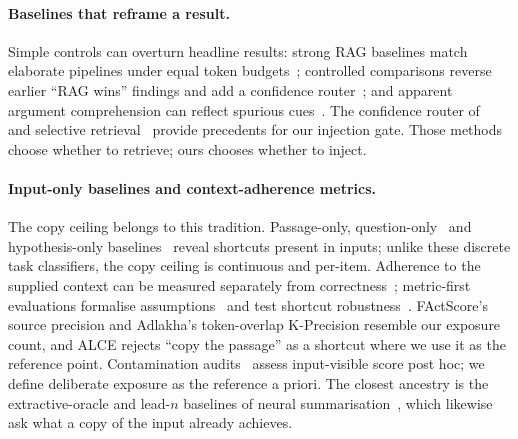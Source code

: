 \documentclass[10pt,twocolumn]{article}
\begin{document}
\paragraph{Baselines that reframe a result.}
Simple controls can overturn headline results: strong RAG baselines match elaborate pipelines under equal token budgets~\cite{laitenberger2025stronger}; controlled comparisons reverse earlier ``RAG wins'' findings and add a confidence router~\cite{li2024ragorlongcontext}; and apparent argument comprehension can reflect spurious cues~\cite{niven2019probing}. The confidence router of~\textcite{li2024ragorlongcontext} and selective retrieval~\cite{asai2024selfrag,jeong2024adaptiverag,mallen2023trust} provide precedents for our injection gate. Those methods choose whether to retrieve; ours chooses whether to inject.

\paragraph{Input-only baselines and context-adherence metrics.}
The copy ceiling belongs to this tradition. Passage-only, question-only~\cite{kaushik2018reading} and hypothesis-only baselines~\cite{gururangan2018artifacts,poliak2018hypothesis} reveal shortcuts present in inputs; unlike these discrete task classifiers, the copy ceiling is continuous and per-item. Adherence to the supplied context can be measured separately from correctness~\cite{es2023ragas,adlakha2024evaluating,zhou2023contextfaithful}; metric-first evaluations formalise assumptions~\cite{min2023factscore} and test shortcut robustness~\cite{gao2023alce}. FActScore's source precision and Adlakha's token-overlap K-Precision resemble our exposure count, and ALCE rejects ``copy the passage'' as a shortcut where we use it as the reference point. Contamination audits~\cite{sainz2023contamination,golchin2024timetravel} assess input-visible score post hoc; we define deliberate exposure as the reference a priori. The closest ancestry is the extractive-oracle and lead-$n$ baselines of neural summarisation~\cite{see2017pointergenerator,narayan2018xsum}, which likewise ask what a copy of the input already achieves.
\end{document}
